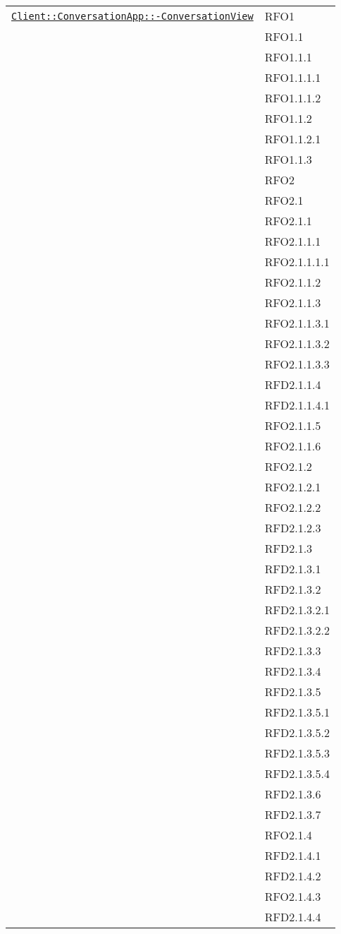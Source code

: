 \begin{longtable}{|>{\centering}m{10cm}|m{3cm}<{\centering}|}
\hyperref[Client::ConversationApp::ConversationView]{\texttt{Client::ConversationApp::-\linebreak ConversationView}} & RFO1\\
& RFO1.1\\
& RFO1.1.1\\
& RFO1.1.1.1\\
& RFO1.1.1.2\\
& RFO1.1.2\\
& RFO1.1.2.1\\
& RFO1.1.3\\
& RFO2\\
& RFO2.1\\
& RFO2.1.1\\
& RFO2.1.1.1\\
& RFO2.1.1.1.1\\
& RFO2.1.1.2\\
& RFO2.1.1.3\\
& RFO2.1.1.3.1\\
& RFO2.1.1.3.2\\
& RFO2.1.1.3.3\\
& RFD2.1.1.4\\
& RFD2.1.1.4.1\\
& RFO2.1.1.5\\
& RFO2.1.1.6\\
& RFO2.1.2\\
& RFO2.1.2.1\\
& RFO2.1.2.2\\
& RFD2.1.2.3\\
& RFD2.1.3\\
& RFD2.1.3.1\\
& RFD2.1.3.2\\
& RFD2.1.3.2.1\\
& RFD2.1.3.2.2\\
& RFD2.1.3.3\\
& RFD2.1.3.4\\
& RFD2.1.3.5\\
& RFD2.1.3.5.1\\
& RFD2.1.3.5.2\\
& RFD2.1.3.5.3\\
& RFD2.1.3.5.4\\
& RFD2.1.3.6\\
& RFD2.1.3.7\\
& RFO2.1.4\\
& RFD2.1.4.1\\
& RFD2.1.4.2\\
& RFO2.1.4.3\\
& RFD2.1.4.4\\

\end{longtable}
